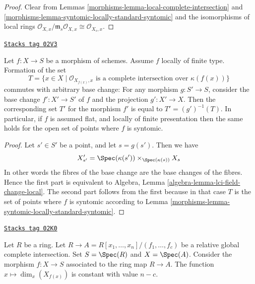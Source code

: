 \begin{proof}

Clear from Lemmas
\ref{morphisms-lemma-local-complete-intersection} and
\ref{morphisms-lemma-syntomic-locally-standard-syntomic}
and the isomorphisms of local rings
$
\mathcal{O}_{X, x}/\mathfrak m_s \mathcal{O}_{X, x}
\cong
\mathcal{O}_{X_s, x}
$.
\end{proof}

\begin{lemma}
\label{morphisms-lemma-set-points-where-fibres-lci}
\href{https://stacks.math.columbia.edu/tag/02V3}{\texttt{Stacks tag 02V3}}

Let $f : X \to S$ be a morphism of schemes.
Assume $f$ locally of finite type. Formation of the set
$$
T = \{x \in X \mid \mathcal{O}_{X_{f(x)}, x}
\text{ is a complete intersection over }\kappa(f(x))\}
$$
commutes with arbitrary base change:
For any morphism $g : S' \to S$, consider
the base change $f' : X' \to S'$ of $f$ and the
projection $g' : X' \to X$. Then the corresponding
set $T'$ for the morphism $f'$ is equal to $T' = (g')^{-1}(T)$.
In particular, if $f$ is assumed flat, and locally of finite
presentation then the same holds for the open set of points
where $f$ is syntomic.
\end{lemma}

\begin{proof}

Let $s' \in S'$ be a point, and let $s = g(s')$. Then we have
$$
X'_{s'} =
\Spec(\kappa(s')) \times_{\Spec(\kappa(s))} X_s
$$
In other words the fibres of the base change are the base changes
of the fibres. Hence the first part is equivalent to
Algebra, Lemma \ref{algebra-lemma-lci-field-change-local}.
The second part follows from the first because in that case
$T$ is the set of points where $f$ is syntomic according to
Lemma \ref{morphisms-lemma-syntomic-locally-standard-syntomic}.
\end{proof}

\begin{lemma}
\label{morphisms-lemma-standard-syntomic-relative-dimension}
\href{https://stacks.math.columbia.edu/tag/02K0}{\texttt{Stacks tag 02K0}}

Let $R$ be a ring.
Let $R \to A = R[x_1, \ldots, x_n]/(f_1, \ldots, f_c)$ be a relative
global complete intersection. Set $S = \Spec(R)$ and
$X = \Spec(A)$. Consider the morphism
$f : X \to S$ associated to the ring map $R \to A$.
The function $x \mapsto \dim_x(X_{f(x)})$ is constant with value $n - c$.
\end{lemma}

